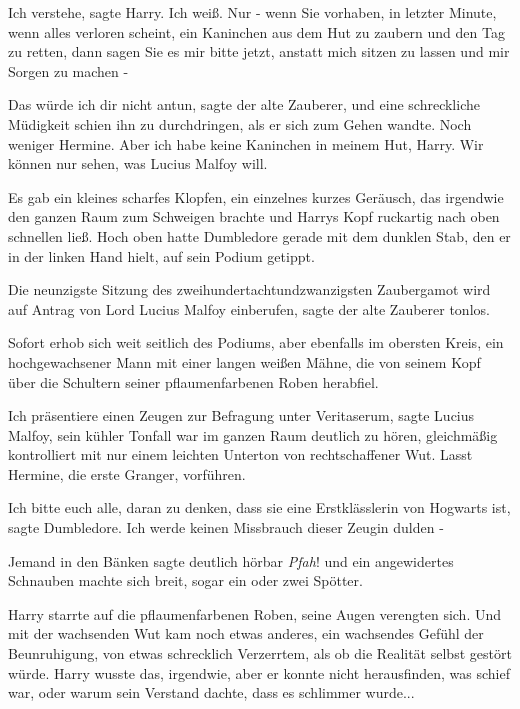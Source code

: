 \glqq{}Ich verstehe\grqq{}, sagte Harry. \glqq{}Ich weiß. Nur - wenn Sie vorhaben,
in letzter Minute, wenn alles verloren scheint, ein Kaninchen aus dem Hut zu
zaubern und den Tag zu retten, dann sagen Sie es mir bitte jetzt, anstatt mich
sitzen zu lassen und mir Sorgen zu machen -\grqq{}

\glqq{}Das würde ich dir nicht antun\grqq{}, sagte der alte Zauberer, und eine
schreckliche Müdigkeit schien ihn zu durchdringen, als er sich zum Gehen wandte.
\glqq{}Noch weniger Hermine. Aber ich habe keine Kaninchen in meinem Hut, Harry.
Wir können nur sehen, was Lucius Malfoy will.\grqq{}

Es gab ein kleines scharfes Klopfen, ein einzelnes kurzes Geräusch, das
irgendwie den ganzen Raum zum Schweigen brachte und Harrys Kopf ruckartig nach
oben schnellen ließ. Hoch oben hatte Dumbledore gerade mit dem dunklen Stab, den
er in der linken Hand hielt, auf sein Podium getippt.

\glqq{}Die neunzigste Sitzung des zweihundertachtundzwanzigsten Zaubergamot wird
auf Antrag von Lord Lucius Malfoy einberufen\grqq{}, sagte der alte Zauberer
tonlos.

Sofort erhob sich weit seitlich des Podiums, aber ebenfalls im obersten Kreis,
ein hochgewachsener Mann mit einer langen weißen Mähne, die von seinem Kopf über
die Schultern seiner pflaumenfarbenen Roben herabfiel.

\glqq{}Ich präsentiere einen Zeugen zur Befragung unter Veritaserum\grqq{}, sagte
Lucius Malfoy, sein kühler Tonfall war im ganzen Raum deutlich zu hören,
gleichmäßig kontrolliert mit nur einem leichten Unterton von rechtschaffener
Wut. \glqq{}Lasst Hermine, die erste Granger, vorführen.\grqq{}

\glqq{}Ich bitte euch alle, daran zu denken, dass sie eine Erstklässlerin von
Hogwarts ist\grqq{}, sagte Dumbledore. \glqq{}Ich werde keinen Missbrauch dieser
Zeugin dulden -\grqq{}

Jemand in den Bänken sagte deutlich hörbar \glqq{}\emph{Pfah}!\grqq{} und ein
angewidertes Schnauben machte sich breit, sogar ein oder zwei Spötter.

Harry starrte auf die pflaumenfarbenen Roben, seine Augen verengten sich. Und
mit der wachsenden Wut kam noch etwas anderes, ein wachsendes Gefühl der
Beunruhigung, von etwas schrecklich Verzerrtem, als ob die Realität selbst
gestört würde. Harry wusste das, irgendwie, aber er konnte nicht herausfinden,
was schief war, oder warum sein Verstand dachte, dass es schlimmer wurde...

